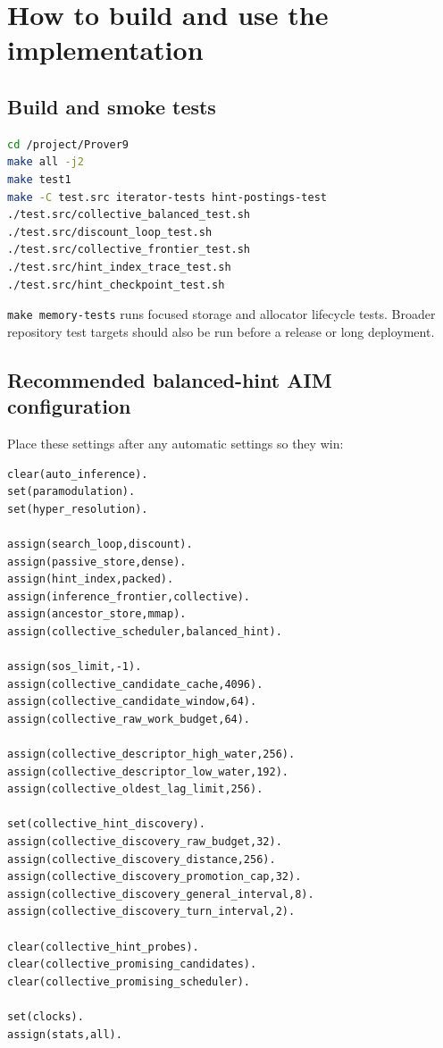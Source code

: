\documentclass[11pt]{article}
\newcommand{\setting}[1]{\texttt{#1}}
\begin{document}
\section{How to build and use the implementation}

\subsection{Build and smoke tests}

\begin{lstlisting}[language=bash]
cd /project/Prover9
make all -j2
make test1
make -C test.src iterator-tests hint-postings-test
./test.src/collective_balanced_test.sh
./test.src/discount_loop_test.sh
./test.src/collective_frontier_test.sh
./test.src/hint_index_trace_test.sh
./test.src/hint_checkpoint_test.sh
\end{lstlisting}

\setting{make memory-tests} runs focused storage and allocator lifecycle tests.
Broader repository test targets should also be run before a release or long
deployment.

\subsection{Recommended balanced-hint AIM configuration}

Place these settings after any automatic settings so they win:

\begin{lstlisting}
clear(auto_inference).
set(paramodulation).
set(hyper_resolution).

assign(search_loop,discount).
assign(passive_store,dense).
assign(hint_index,packed).
assign(inference_frontier,collective).
assign(ancestor_store,mmap).
assign(collective_scheduler,balanced_hint).

assign(sos_limit,-1).
assign(collective_candidate_cache,4096).
assign(collective_candidate_window,64).
assign(collective_raw_work_budget,64).

assign(collective_descriptor_high_water,256).
assign(collective_descriptor_low_water,192).
assign(collective_oldest_lag_limit,256).

set(collective_hint_discovery).
assign(collective_discovery_raw_budget,32).
assign(collective_discovery_distance,256).
assign(collective_discovery_promotion_cap,32).
assign(collective_discovery_general_interval,8).
assign(collective_discovery_turn_interval,2).

clear(collective_hint_probes).
clear(collective_promising_candidates).
clear(collective_promising_scheduler).

set(clocks).
assign(stats,all).
\end{lstlisting}
\end{document}
